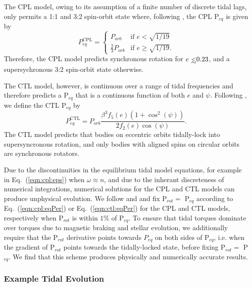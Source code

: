 \documentclass[twocolumn]{aastex61}
\def\lsim{~\rlap{$<$}{\lower 1.0ex\hbox{$\sim$}}}
\begin{document}
The CPL model, owing to its assumption of a finite number of discrete tidal lags, only permits a 1:1 and 3:2 spin-orbit state where, following \citet{Barnes2017}, the CPL P$_{eq}$ is given by
\begin{equation} \label{eqn:cpl:eqPer}
P^{\mathrm{CPL}}_{eq} = 
\begin{cases}
P_{orb} & \text{if } e < \sqrt{1/19}\\
\frac{2}{3}P_{orb} & \text{if } e \geq \sqrt{1/19}.
\end{cases}
\end{equation}
Therefore, the CPL model predicts synchronous rotation for $e \lsim 0.23$, and a supersychronous 3:2 spin-orbit state otherwise.

The CTL model, however, is continuous over a range of tidal frequencies and therefore predicts a P$_{eq}$ that is a continuous function of both $e$ and $\psi$.  Following \citet{Barnes2017}, we define the CTL P$_{eq}$ by
\begin{equation} \label{eqn:ctl:eqPer}
P^{\mathrm{CTL}}_{eq} = P_{orb} \frac{\beta^3 f_5(e) (1 + \cos^2(\psi))}{2f_2(e) \cos(\psi)}.
\end{equation}
The CTL model predicts that bodies on eccentric orbits tidally-lock into supersyncronous rotation, and only bodies with aligned spins on circular orbits are synchronous rotators. 

Due to the discontinuities in the equilibrium tidal model equations, for example in Eq.~(\ref{eqn:cpl:eps}) when $\omega \approx n$, and due to the inherant discreteness of numerical integrations, numerical solutions for the CPL and CTL models can produce unphysical evolution. We follow \citet{Barnes2013} and \citet{Fleming2018} and fix P$_{rot} = $ P$_{eq}$ according to Eq.~(\ref{eqn:cpl:eqPer}) or Eq.~(\ref{eqn:ctl:eqPer}) for the CPL and CTL models, respectively when P$_{rot}$ is within $1\%$ of P$_{eq}$.  To ensure that tidal torques dominate over torques due to magnetic braking and stellar evolution, we additionally require that the P$_{rot}$ derivative points towards $P_{eq}$ on both sides of P$_{eq}$, i.e. when the gradient of P$_{rot}$ points towards the tidally-locked state, before fixing P$_{rot} = $ P$_{eq}$. We find that this scheme produces physically and numerically accurate results. 

\subsubsection{Example Tidal Evolution} \label{sec:methods:eqtideExample}
\end{document}
